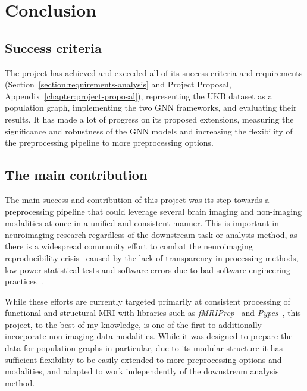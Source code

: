 \chapter{Conclusion}



\section{Success criteria}
The project has achieved and exceeded all of its success criteria and requirements (Section~\ref{section:requirements-analysis} and Project Proposal, Appendix~\ref{chapter:project-proposal}), representing the UKB dataset as a population graph, implementing the two GNN frameworks, and evaluating their results. It has made a lot of progress on its proposed extensions, measuring the significance and robustness of the GNN models and increasing the flexibility of the preprocessing pipeline to more preprocessing options.

\section{The main contribution}
The main success and contribution of this project was its step towards a preprocessing pipeline that could leverage several brain imaging and non-imaging modalities at once in a unified and consistent manner. This is important in neuroimaging research regardless of the downstream task or analysis method, as there is a widespread community effort to combat the neuroimaging reproducibility crisis~\cite{gorgolewski2016practical} caused by the lack of transparency in processing methods, low power statistical tests and software errors due to bad software engineering practices~\cite{poldrack2017scanning}.

While these efforts are currently targeted primarily at consistent processing of functional and structural MRI with libraries such as \textit{fMRIPrep}~\cite{esteban2019fmriprep} and \textit{Pypes}~\cite{savio2017pypes}, this project, to the best of my knowledge, is one of the first to additionally incorporate non-imaging data modalities. While it was designed to prepare the data for population graphs in particular, due to its modular structure it has sufficient flexibility to be easily extended to more preprocessing options and modalities, and adapted to work independently of the downstream analysis method.

